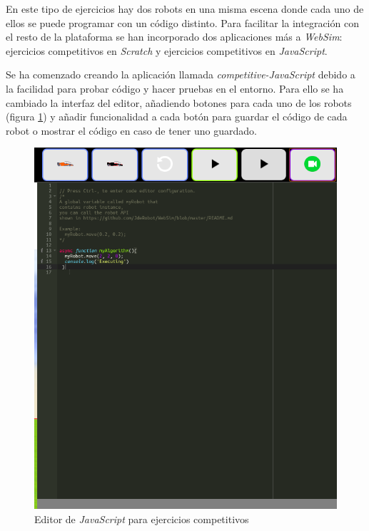 
En este tipo de ejercicios hay dos robots en una misma escena donde cada uno de ellos se puede programar con un código distinto. Para facilitar la integración con el resto de la plataforma se han incorporado dos aplicaciones más a \textit{WebSim}: ejercicios competitivos en \textit{Scratch} y ejercicios competitivos en \textit{JavaScript}. 


Se ha comenzado creando la aplicación llamada \textit{competitive-JavaScript} debido a la facilidad para probar código y hacer pruebas en el entorno. Para ello se ha cambiado la interfaz del editor, añadiendo botones para cada uno de los robots (figura \ref{fig:javascript_competitivo}) y añadir funcionalidad a cada botón para guardar el código de cada robot o mostrar el código en caso de tener uno guardado.

    \begin{figure}[h]
        \centering            \includegraphics[scale=0.30]{img/competitiveEditorJavascript.png}
        \caption{Editor de \textit{JavaScript} para ejercicios competitivos}
        \label{fig:javascript_competitivo}
    \end{figure}

